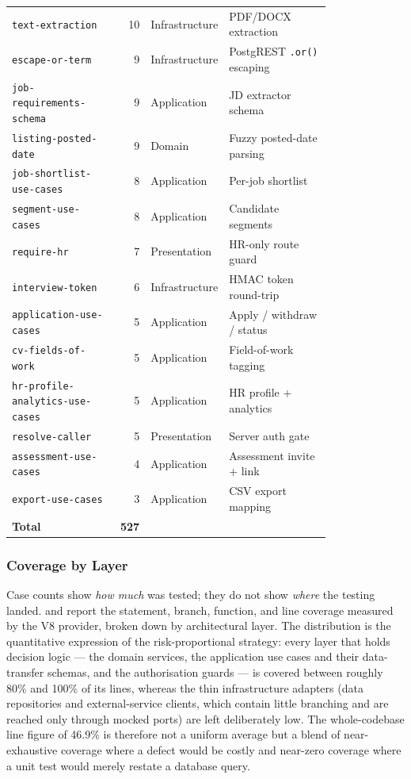 \begin{table}[H]
\begin{tabular}{p{0.32\linewidth}r p{0.16\linewidth}p{0.32\linewidth}}
\texttt{text-extraction} & 10 & Infrastructure & PDF/DOCX extraction \\
\texttt{escape-or-term} & 9 & Infrastructure & PostgREST \texttt{.or()} escaping \\
\texttt{job-requirements-schema} & 9 & Application & JD extractor schema \\
\texttt{listing-posted-date} & 9 & Domain & Fuzzy posted-date parsing \\
\texttt{job-shortlist-use-cases} & 8 & Application & Per-job shortlist \\
\texttt{segment-use-cases} & 8 & Application & Candidate segments \\
\texttt{require-hr} & 7 & Presentation & HR-only route guard \\
\texttt{interview-token} & 6 & Infrastructure & HMAC token round-trip \\
\texttt{application-use-cases} & 5 & Application & Apply / withdraw / status \\
\texttt{cv-fields-of-work} & 5 & Application & Field-of-work tagging \\
\texttt{hr-profile-analytics-use-cases} & 5 & Application & HR profile + analytics \\
\texttt{resolve-caller} & 5 & Presentation & Server auth gate \\
\texttt{assessment-use-cases} & 4 & Application & Assessment invite + link \\
\texttt{export-use-cases} & 3 & Application & CSV export mapping \\
\midrule
\textbf{Total} & \textbf{527} & & \\
\bottomrule
\end{tabular}
\end{table}

\subsubsection{Coverage by Layer}

Case counts show \emph{how much} was tested; they do not show \emph{where}
the testing landed.  and
 report the statement, branch, function, and
line coverage measured by the V8 provider, broken down by architectural
layer. The distribution is the quantitative expression of the
risk-proportional strategy: every layer that holds decision logic --- the
domain services, the application use cases and their data-transfer schemas,
and the authorisation guards --- is covered between roughly 80\% and 100\%
of its lines, whereas the thin infrastructure adapters (data repositories and
external-service clients, which contain little branching and are reached only
through mocked ports) are left deliberately low. The whole-codebase line
figure of 46.9\% is therefore not a uniform average but a blend of
near-exhaustive coverage where a defect would be costly and near-zero
coverage where a unit test would merely restate a database query.

